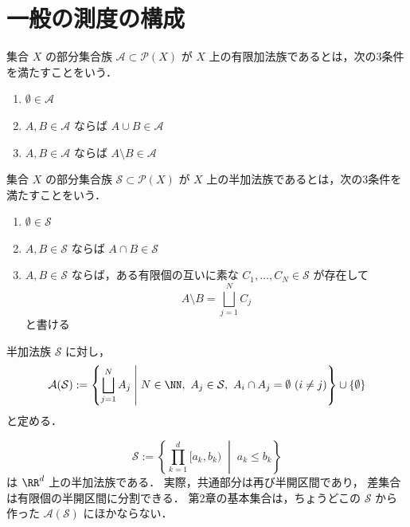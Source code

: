 \section{一般の測度の構成}

\begin{definition}[有限加法族]
集合 $X$ の部分集合族 $\mathcal A \subset \mathcal P(X)$ が
$X$ 上の有限加法族であるとは，次の3条件を満たすことをいう．
\begin{enumerate}
    \item $\emptyset \in \mathcal A$
    \item $A,B \in \mathcal A$ ならば $A \cup B \in \mathcal A$
    \item $A,B \in \mathcal A$ ならば $A \setminus B \in \mathcal A$
\end{enumerate}
\end{definition}

\begin{definition}[半加法族]
集合 $X$ の部分集合族 $\mathcal S \subset \mathcal P(X)$ が
$X$ 上の半加法族であるとは，次の3条件を満たすことをいう．
\begin{enumerate}
    \item $\emptyset \in \mathcal S$
    \item $A,B \in \mathcal S$ ならば $A \cap B \in \mathcal S$
    \item $A,B \in \mathcal S$ ならば，ある有限個の互いに素な
    $C_1,\dots,C_N \in \mathcal S$ が存在して
    \[
    A \setminus B = \bigsqcup_{j=1}^N C_j
    \]
    と書ける
\end{enumerate}
\end{definition}

\begin{definition}[半加法族が生成する有限加法族]
半加法族 $\mathcal S$ に対し，
\[
\mathcal A(\mathcal S)
:=
\left\{
\bigsqcup_{j=1}^N A_j
\;\middle|\;
N \in \NN,\ A_j \in \mathcal S,\ A_i \cap A_j = \emptyset\ (i \ne j)
\right\}
\cup \{\emptyset\}
\]
と定める．
\end{definition}

\begin{example}[半開区間の族]
\[
\mathcal S
:=
\left\{
\prod_{k=1}^d [a_k,b_k)
\;\middle|\;
a_k \le b_k
\right\}
\]
は $\RR^d$ 上の半加法族である．
実際，共通部分は再び半開区間であり，
差集合は有限個の半開区間に分割できる．
第2章の基本集合は，ちょうどこの $\mathcal S$ から作った
$\mathcal A(\mathcal S)$ にほかならない．
\end{example}

